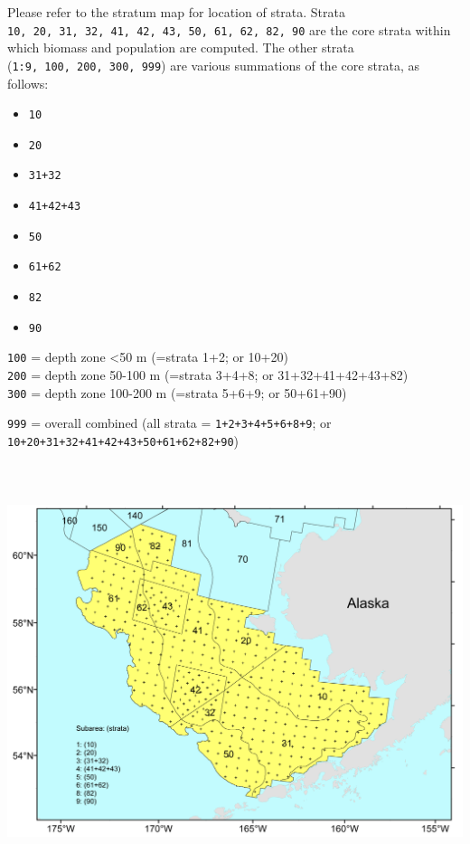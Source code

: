 \documentclass[
]{book}
\providecommand{\tightlist}{%
  \setlength{\itemsep}{0pt}\setlength{\parskip}{0pt}}
\begin{document}
Please refer to the stratum map for location of strata.
Strata \texttt{10,\ 20,\ 31,\ 32,\ 41,\ 42,\ 43,\ 50,\ 61,\ 62,\ 82,\ 90} are the core strata within which biomass and population are computed.
The other strata (\texttt{1:9,\ 100,\ 200,\ 300,\ 999}) are various summations of the core strata, as follows:

\begin{itemize}
\tightlist
\item
  \texttt{10}
\item
  \texttt{20}
\item
  \texttt{31+32}
\item
  \texttt{41+42+43}
\item
  \texttt{50}
\item
  \texttt{61+62}
\item
  \texttt{82}
\item
  \texttt{90}
\end{itemize}

\texttt{100} = depth zone \textless50 m (=strata 1+2; or 10+20)\\
\texttt{200} = depth zone 50-100 m (=strata 3+4+8; or 31+32+41+42+43+82)\\
\texttt{300} = depth zone 100-200 m (=strata 5+6+9; or 50+61+90)

\texttt{999} = overall combined (all strata = \texttt{1+2+3+4+5+6+8+9}; or \texttt{10+20+31+32+41+42+43+50+61+62+82+90})

\includegraphics[width=800px,height=460px]{figs/EBS_shelf_strata}
\end{document}

